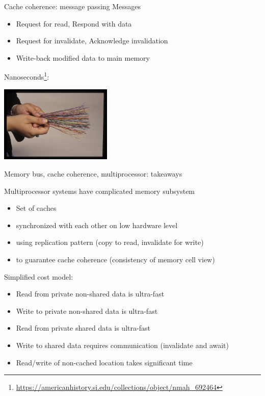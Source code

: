 \begin{frame}{Cache coherence: message passing}
Messages
\begin{itemize}
  \item Request for read, Respond with data
  \item Request for invalidate, Acknowledge invalidation
  \item Write-back modified data to main memory
\end{itemize}

\pause

Nanoseconds\footnote<2->{\tiny\url{https://americanhistory.si.edu/collections/object/nmah_692464}}:
\begin{center} 
  \includegraphics[width=0.4\textwidth]{./pics/nano.jpg} 
\end{center}
\end{frame}

\begin{frame}{Memory bus, cache coherence, multiprocessor: takeaways}

Multiprocessor systems have complicated memory subsystem
\begin{itemize}
  \pause
  \item Set of caches
  \pause
  \item synchronized with each other on low hardware level
  \pause
  \item using replication pattern (copy to read, invalidate for write)
  \pause
  \item to guarantee cache coherence (consistency of memory cell view)
\end{itemize}

\pause
Simplified cost model:
\begin{itemize}
  \item Read from private non-shared data is ultra-fast
  \item Write to private non-shared data is ultra-fast
  \item Read from private shared data is ultra-fast
  \item Write to shared data requires communication (invalidate and await)
  \item Read/write of non-cached location takes significant time
\end{itemize}

\end{frame}

